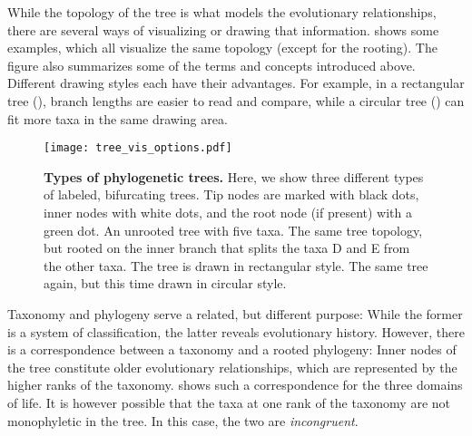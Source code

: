 While the topology of the tree is what models the evolutionary relationships,
there are several ways of visualizing or drawing that information.
 shows some examples, which all visualize the same topology (except for the rooting).
The figure also summarizes some of the terms and concepts introduced above.
Different drawing styles each have their advantages.
For example, in a rectangular tree (),
branch lengths are easier to read and compare,
while a circular tree () can fit more taxa in the same drawing area.

\begin{figure}[hpbt]
    \centering
    \texttt{[image: tree\_vis\_options.pdf]}
    \begin{subfigure}{0pt}
        \label{fig:tree_vis_options:sub:unrooted}
    \end{subfigure}
    \begin{subfigure}{0pt}
        \label{fig:tree_vis_options:sub:rectangular}
    \end{subfigure}
    \begin{subfigure}{0pt}
        \label{fig:tree_vis_options:sub:circular}
    \end{subfigure}
    \caption[Types of phylogenetic trees]{
        \textbf{Types of phylogenetic trees.}
        Here, we show three different types of labeled, bifurcating trees.
        Tip nodes are marked with black dots, inner nodes with white dots, and the root node (if present) with a green dot.
         An unrooted tree with five taxa.
         The same tree topology,
        but rooted on the inner branch that splits the taxa {\sffamily D} and {\sffamily E} from the other taxa.
        The tree is drawn in rectangular style.
         The same tree again, but this time drawn in circular style.
    }
    \label{fig:tree_vis_options}
\end{figure}

Taxonomy and phylogeny serve a related, but different purpose:
While the former is a system of classification,
the latter reveals evolutionary history.
However, there is a correspondence between a taxonomy and a rooted phylogeny:
Inner nodes of the tree constitute older evolutionary relationships,
which are represented by the higher ranks of the taxonomy.
 shows such a correspondence for the three domains of life.
It is however possible that the taxa at one rank of the taxonomy are not monophyletic in the tree.
In this case, the two are \emph{incongruent}.

